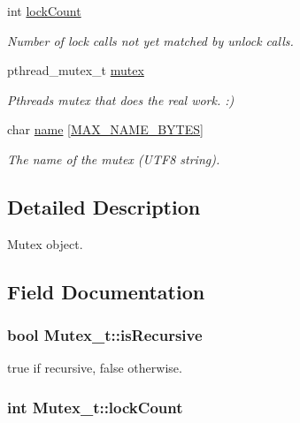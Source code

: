 \begin{DoxyCompactItemize}
int \hyperlink{struct_mutex__t_a5626c227762bcf039841861426bf566d}{lock\+Count}
\begin{DoxyCompactList}\small\item\em Number of lock calls not yet matched by unlock calls. \end{DoxyCompactList}\item 
pthread\+\_\+mutex\+\_\+t \hyperlink{struct_mutex__t_a4889ab228b7d5dfc2587f41bafa7b7f9}{mutex}
\begin{DoxyCompactList}\small\item\em Pthreads mutex that does the real work. \+:) \end{DoxyCompactList}\item 
char \hyperlink{struct_mutex__t_a9296c665a3436da60ab839a401ca4e94}{name} \mbox{[}\hyperlink{safe_ref_8c_ab66a1b76292b571536c72e3795a5640d}{M\+A\+X\+\_\+\+N\+A\+M\+E\+\_\+\+B\+Y\+T\+ES}\mbox{]}
\begin{DoxyCompactList}\small\item\em The name of the mutex (U\+T\+F8 string). \end{DoxyCompactList}\end{DoxyCompactItemize}


\subsection{Detailed Description}
Mutex object. 

\subsection{Field Documentation}
\subsubsection[{\texorpdfstring{is\+Recursive}{isRecursive}}]{\setlength{\rightskip}{0pt plus 5cm}bool Mutex\+\_\+t\+::is\+Recursive}\hypertarget{struct_mutex__t_abcb4902349befa90593a9fe0f1b868ab}{}\label{struct_mutex__t_abcb4902349befa90593a9fe0f1b868ab}


true if recursive, false otherwise. 

\subsubsection[{\texorpdfstring{lock\+Count}{lockCount}}]{\setlength{\rightskip}{0pt plus 5cm}int Mutex\+\_\+t\+::lock\+Count}\hypertarget{struct_mutex__t_a5626c227762bcf039841861426bf566d}{}\label{struct_mutex__t_a5626c227762bcf039841861426bf566d}


